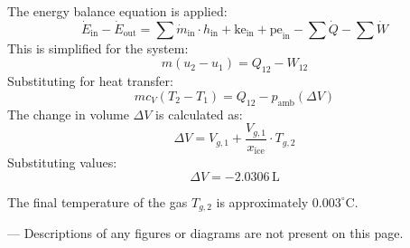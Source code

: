 The energy balance equation is applied:  
\[
\dot{E}_{\text{in}} - \dot{E}_{\text{out}} = \sum \dot{m}_{\text{in}} \cdot h_{\text{in}} + \text{ke}_{\text{in}} + \text{pe}_{\text{in}} - \sum \dot{Q} - \sum \dot{W}
\]  
This is simplified for the system:  
\[
m(u_2 - u_1) = Q_{12} - W_{12}
\]  
Substituting for heat transfer:  
\[
mc_V (T_2 - T_1) = Q_{12} - p_{\text{amb}} (\Delta V)
\]  
The change in volume \( \Delta V \) is calculated as:  
\[
\Delta V = V_{g,1} + \frac{V_{g,1}}{x_{\text{ice}}} \cdot T_{g,2}
\]  
Substituting values:  
\[
\Delta V = -2.0306 \, \text{L}
\]  

The final temperature of the gas \( T_{g,2} \) is approximately \( 0.003^\circ \text{C} \).  

---  
Descriptions of any figures or diagrams are not present on this page.